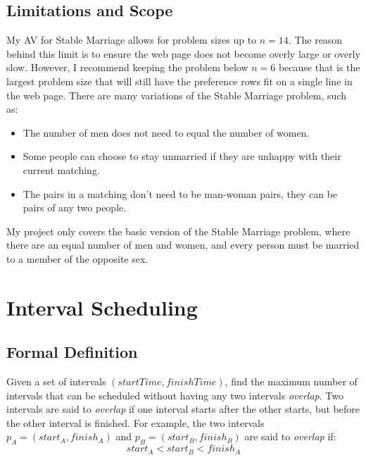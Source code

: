 \subsection{Limitations and Scope}
\hspace{-0.26in}
My AV for Stable Marriage allows for problem sizes up to $n = 14$.
The reason behind this limit is to ensure the web page 
does not become overly large or overly slow. 
However, I recommend keeping the problem below $n = 6$ because that is 
the largest problem size that will still have the preference rows
fit on a single line in the web page. 
\newline\newline
There are many variations of the Stable Marriage problem, such as:
\begin{itemize}
	\item The number of men does not need to equal the number of women.
	\item Some people can choose to stay unmarried if they are unhappy 
		with their current matching.
	\item The pairs in a matching don't need to be man-woman pairs, they can be
		pairs of any two people.
\end{itemize} 
My project only covers the basic version of the Stable Marriage problem, where 
there are an equal number of men and women, and every person must be married to 
a member of the opposite sex. \cite{textbook}
\section{Interval Scheduling}
%
\subsection{Formal Definition}
\hspace{-0.26in}
Given a set of intervals $(start Time, finish Time)$, 
find the maximum number of intervals that can be scheduled 
without having any two intervals \textit{overlap}. 
\newline\newline
Two intervals are said to \textit{overlap} if one interval
starts after the other starts, but before the other interval is finished. 
For example, the two intervals 
$p_A = (start_A, finish_A)$ 
and
$ p_B=(start_B, finish_B)$
are said to \textit{overlap} if:
\begin{displaymath}
start_A < start_B < finish_A
\end{displaymath}
%
